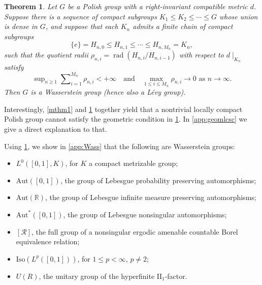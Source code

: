 \documentclass{amsart}
\numberwithin{equation}{subsection}
\theoremstyle{plain}
\newtheorem{mainthm}{Theorem}
\theoremstyle{definition}
\theoremstyle{plain}
\begin{document}
\begin{mainthm}\label{mthm2}
Let \(G\) be a Polish group with a right-invariant compatible metric \(d\). Suppose there is a sequence of compact subgroups \(K_{1}\leq K_{2}\leq\dotsm\leq G\) whose union is dense in \(G\), and suppose that each \(K_{n}\) admits a finite chain of compact subgroups
\[\{e\}=H_{n,0}\leq H_{n,1}\leq\dotsm\leq H_{n,M_{n}}=K_{n},\]
such that the quotient radii \(\rho_{n,i}=\operatorname{rad}\left(H_{n,i}/H_{n,i-1}\right)\) with respect to \(d\mid_{K_{n}}\) satisfy
\[\sup\nolimits_{n\geq 1}\sum\nolimits_{i=1}^{M_{n}}\rho_{n,i}<+\infty\quad\text{and}\quad\max_{1\leq i\leq M_{n}}\rho_{n,i}\to 0\text{ as }n\to\infty.\]
Then \(G\) is a Wasserstein group (hence also a L\'{e}vy group).
\end{mainthm}

Interestingly, \cref{mthm1} and \cref{mthm2} together yield that a nontrivial locally compact Polish group cannot satisfy the geometric condition in \cref{mthm2}. In \cref{app:geomlcsc} we give a direct explanation to that.

\smallskip

Using \cref{mthm2}, we show in \cref{app:Wass} that the following are Wasserstein groups:
\begin{itemize}
    \item \(L^{0}\left(\left[0,1\right],K\right)\), for \(K\) a compact metrizable group;
    \item \(\mathrm{Aut}\left(\left[0,1\right]\right)\), the group of Lebesgue probability preserving automorphisms;
    \item \(\mathrm{Aut}\left(\mathbb{R}\right)\), the group of Lebesgue infinite measure preserving automorphisms;
    \item \(\mathrm{Aut}^{\ast}\left(\left[0,1\right]\right)\), the group of Lebesgue nonsingular automorphisms;
    \item \(\left[\mathcal{R}\right]\), the full group of a nonsingular ergodic amenable countable Borel equivalence relation;
    \item \(\mathrm{Iso}\left(L^{p}\left(\left[0,1\right]\right)\right)\), for \(1\leq p<\infty\), \(p\neq2\);
    \item \(U\left(R\right)\), the unitary group of the hyperfinite \(\mathrm{II}_{1}\)-factor.
\end{itemize}
\end{document}
